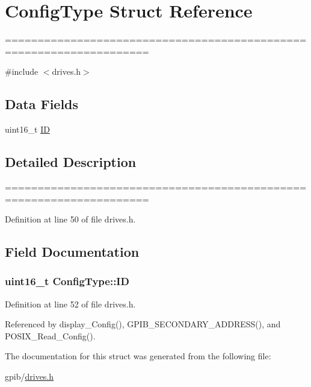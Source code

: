 \hypertarget{structConfigType}{}\section{Config\+Type Struct Reference}
\label{structConfigType}


====================================================================  




{\ttfamily \#include $<$drives.\+h$>$}

\subsection*{Data Fields}
\begin{DoxyCompactItemize}
\item 
uint16\+\_\+t \hyperlink{structConfigType_a7d89346361dc0f06db0917c7ff37501a}{ID}
\end{DoxyCompactItemize}


\subsection{Detailed Description}
==================================================================== 

Definition at line 50 of file drives.\+h.



\subsection{Field Documentation}
\subsubsection[{\texorpdfstring{ID}{ID}}]{\setlength{\rightskip}{0pt plus 5cm}uint16\+\_\+t Config\+Type\+::\+ID}\hypertarget{structConfigType_a7d89346361dc0f06db0917c7ff37501a}{}\label{structConfigType_a7d89346361dc0f06db0917c7ff37501a}


Definition at line 52 of file drives.\+h.



Referenced by display\+\_\+\+Config(), G\+P\+I\+B\+\_\+\+S\+E\+C\+O\+N\+D\+A\+R\+Y\+\_\+\+A\+D\+D\+R\+E\+S\+S(), and P\+O\+S\+I\+X\+\_\+\+Read\+\_\+\+Config().



The documentation for this struct was generated from the following file\+:\begin{DoxyCompactItemize}
\item 
gpib/\hyperlink{drives_8h}{drives.\+h}\end{DoxyCompactItemize}
